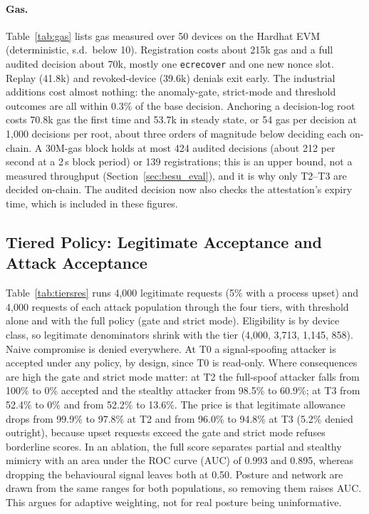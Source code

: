 \paragraph{Gas.}\label{sec:gas} Table~\ref{tab:gas} lists gas measured over 50 devices on the Hardhat EVM (deterministic, s.d.\ below 10). Registration costs about 215k gas and a full audited decision about 70k, mostly one \texttt{ecrecover} and one new nonce slot. Replay (41.8k) and revoked-device (39.6k) denials exit early. The industrial additions cost almost nothing: the anomaly-gate, strict-mode and threshold outcomes are all within 0.3\% of the base decision. Anchoring a decision-log root costs 70.8k gas the first time and 53.7k in steady state, or 54 gas per decision at 1{,}000 decisions per root, about three orders of magnitude below deciding each on-chain. A 30M-gas block holds at most 424 audited decisions (about 212 per second at a 2\,s block period) or 139 registrations; this is an upper bound, not a measured throughput (Section~\ref{sec:besu_eval}), and it is why only T2--T3 are decided on-chain. The audited decision now also checks the attestation's expiry time, which is included in these figures.

\begin{table}[t]
\centering
\caption{Measured gas per operation (Hardhat EVM, solc 0.8.24, 50 devices)}
\label{tab:gas}
\scriptsize

\end{table}

\subsection{Tiered Policy: Legitimate Acceptance and Attack Acceptance}\label{sec:tiers_eval}
Table~\ref{tab:tiersres} runs 4{,}000 legitimate requests (5\% with a process upset) and 4{,}000 requests of each attack population through the four tiers, with threshold alone and with the full policy (gate and strict mode). Eligibility is by device class, so legitimate denominators shrink with the tier (4{,}000, 3{,}713, 1{,}145, 858). Naive compromise is denied everywhere. At T0 a signal-spoofing attacker is accepted under any policy, by design, since T0 is read-only. Where consequences are high the gate and strict mode matter: at T2 the full-spoof attacker falls from 100\% to 0\% accepted and the stealthy attacker from 98.5\% to 60.9\%; at T3 from 52.4\% to 0\% and from 52.2\% to 13.6\%. The price is that legitimate allowance drops from 99.9\% to 97.8\% at T2 and from 96.0\% to 94.8\% at T3 (5.2\% denied outright), because upset requests exceed the gate and strict mode refuses borderline scores. In an ablation, the full score separates partial and stealthy mimicry with an area under the ROC curve (AUC) of 0.993 and 0.895, whereas dropping the behavioural signal leaves both at 0.50. Posture and network are drawn from the same ranges for both populations, so removing them raises AUC. This argues for adaptive weighting, not for real posture being uninformative.

